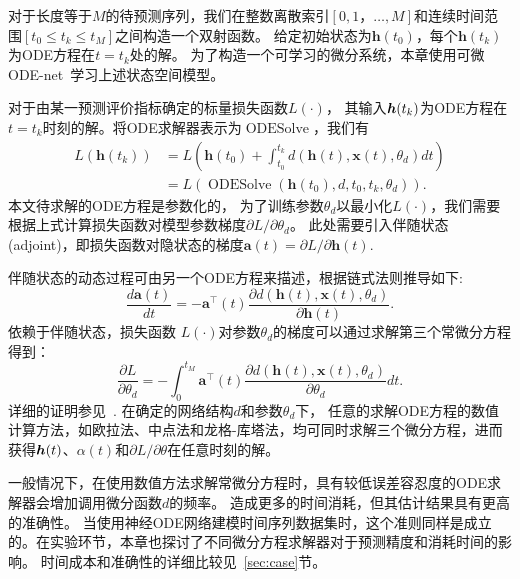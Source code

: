 对于长度等于$M$的待预测序列，我们在整数离散索引$[0,1，\dots,M]$和连续时间范围$[t_0\leq t_k \leq t_{M}]$之间构造一个双射函数。
给定初始状态为$\boldsymbol{h}(t_0)$，每个$\boldsymbol{h}(t_k)$为ODE方程在$t=t_k$处的解。
为了构造一个可学习的微分系统，本章使用可微ODE-net~\cite{NIPS2018_7892}学习上述状态空间模型。

对于由某一预测评价指标确定的标量损失函数$L(\cdot)$，
其输入$\boldsymbol{h}(t_k)$为ODE方程在$t=t_k$时刻的解。将ODE求解器表示为$\operatorname{ODESolve}$，我们有
\begin{align}
\label{equ:loss_ode_solver}
L\left(\boldsymbol{h}\left(t_{k}\right)\right)&=L\left(\boldsymbol{h}\left(t_{0}\right)+\int_{t_{0}}^{t_{k}} d(\boldsymbol{h}(t), \boldsymbol x(t), \theta_d) d t\right)\nonumber\\
&=L\left(\operatorname{ODESolve}\left(\boldsymbol{h}\left(t_{0}\right), d, t_{0}, t_{k}, \theta_d \right)\right).
\end{align}
本文待求解的ODE方程是参数化的，
为了训练参数$\theta _d$以最小化$L(\cdot)$，我们需要根据上式计算损失函数对模型参数梯度$\partial L / \partial \theta _d$。
此处需要引入伴随状态(adjoint)，即损失函数对隐状态的梯度$\boldsymbol{a}(t)=\partial L / \partial \boldsymbol{h}(t)$.

伴随状态的动态过程可由另一个ODE方程来描述，根据链式法则推导如下:
\begin{equation}
\label{equ:ode_at}
\frac{d \boldsymbol{a}(t)}{d t}=-\boldsymbol{a}^{\top}(t) \frac{\partial d(\boldsymbol{h}(t), \boldsymbol x(t), \theta_d)}{\partial \boldsymbol{h}(t)}.
\end{equation}
依赖于伴随状态，损失函数 $L(\cdot)$对参数$\theta _d$的梯度可以通过求解第三个常微分方程得到：
\begin{equation}
\label{equ:grad_ode}
\frac{\partial L}{\partial \theta _d}=-\int_{0}^{t_{M}} \boldsymbol{a}^{\top}(t) \frac{\partial d(\boldsymbol{h}(t), \boldsymbol x(t), \theta _d)}{\partial \theta_d} d t.
\end{equation}
详细的证明参见~\cite{NIPS2018_7892}.
在确定的网络结构$d$和参数$\theta _d$下，
任意的求解ODE方程的数值计算方法，如欧拉法、中点法和龙格-库塔法，均可同时求解三个微分方程，进而获得$\boldsymbol h (t)$、$\alpha (t)$和${\partial L}/{\partial \theta}$在任意时刻的解。

一般情况下，在使用数值方法求解常微分方程时，具有较低误差容忍度的ODE求解器会增加调用微分函数$d$的频率。
造成更多的时间消耗，但其估计结果具有更高的准确性。
当使用神经ODE网络建模时间序列数据集时，这个准则同样是成立的。在实验环节，本章也探讨了不同微分方程求解器对于预测精度和消耗时间的影响。
时间成本和准确性的详细比较见~\ref{sec:case}节。

